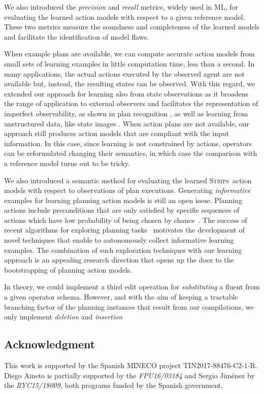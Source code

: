 \documentclass[3p,times]{elsarticle}
\newcommand{\strips}{\textsc{Strips}}     %
\begin{document}
We also introduced the {\em precision} and {\em recall} metrics, widely used in ML, for evaluating the learned action models with respect to a given reference model. These two metrics measure the soundness and completeness of the learned models and facilitate the identification of model flaws.

When example plans are available, we can compute accurate action models from small sets of learning examples in little computation time, less than a second. In many applications, the actual actions executed by the observed agent are not available but, instead, the resulting states can be observed. With this regard, we extended our approach for learning also from state observations as it broadens the range of application to external observers and facilitates the representation of imperfect observability, as shown in plan recognition \cite{SohrabiRU16}, as well as learning from unstructured data, like state images \cite{AsaiF18}. When action plans are not available, our approach still produces action models that are compliant with the input information. In this case, since learning is not constrained by actions, operators can be reformulated changing their semantics, in which case the comparison with a reference model turns out to be tricky.

We also introduced a semantic method for evaluating the learned \strips\ action models with respect to observations of plan executions. Generating {\em informative} examples for learning planning action models is still an open issue. Planning actions include preconditions that are only satisfied by specific sequences of actions which have low probability of being chosen by chance~\cite{fern2004learning}. The success of recent algorithms for exploring planning tasks~\cite{FrancesRLG17} motivates the development of novel techniques that enable to autonomously collect informative learning examples. The combination of such exploration techniques with our learning approach is an appealing research direction that opens up the door to the bootstrapping of planning action models.

In theory, we could implement a third edit operation for {\em substituting} a fluent from a given operator schema. However, and with the aim of keeping a tractable branching factor of the planning instances that result from our compilations, we only implement {\em deletion} and {\em insertion}

\subsection*{Acknowledgment}
This work is supported by the Spanish MINECO project TIN2017-88476-C2-1-R. Diego Aineto is partially supported by the {\it FPU16/03184} and Sergio Jim\'enez by the {\it RYC15/18009}, both programs funded by the Spanish government.
\end{document}
